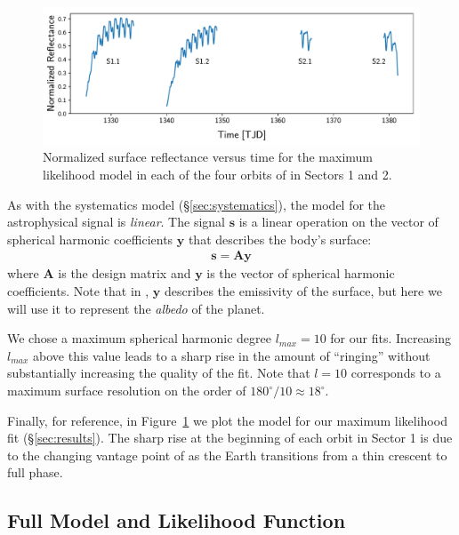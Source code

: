\documentclass[modern]{aastex62}
\begin{document}
\begin{figure}[t!]
    \begin{centering}
    \includegraphics[width=\linewidth]{figures/starry_model.pdf}
    \caption{\label{fig:starry_model}
             Normalized surface reflectance versus time for the maximum
             likelihood \starry model in each of the four orbits of \TESS
             in Sectors 1 and 2.
             }
    \end{centering}
\end{figure}

As with the systematics model (\S\ref{sec:systematics}), the model
for the astrophysical signal is \emph{linear}. The signal $\mathbf{s}$ 
is a linear operation on the vector of spherical harmonic coefficients 
$\mathbf{y}$
that describes the body's surface:
%
\begin{align}
    \mathbf{s} = \mathbf{A} \mathbf{y}
\end{align}
%
where $\mathbf{A}$ is the design matrix and $\mathbf{y}$ is the vector of spherical harmonic coefficients. 
Note that in \cite{Luger2019}, $\mathbf{y}$ describes the emissivity of the surface,
but here we will use it to represent the \emph{albedo} of the planet.

We chose a maximum spherical harmonic degree $l_{max} = 10$ for our fits.
Increasing $l_{max}$ above this value 
leads to a sharp rise in the amount of ``ringing'' without substantially
increasing the quality of the fit. Note that $l = 10$ corresponds to
a maximum surface resolution on the order of $180^\circ/10 \approx 18^\circ$.

Finally, for reference, in Figure~\ref{fig:starry_model} we plot the
\starry model for our maximum likelihood fit (\S\ref{sec:results}). The
sharp rise at the beginning of each orbit in Sector 1 is due to the changing
vantage point of \TESS as the Earth transitions from a thin crescent to full phase.

\subsection{Full Model and Likelihood Function}
\label{sec:model}
\end{document}
